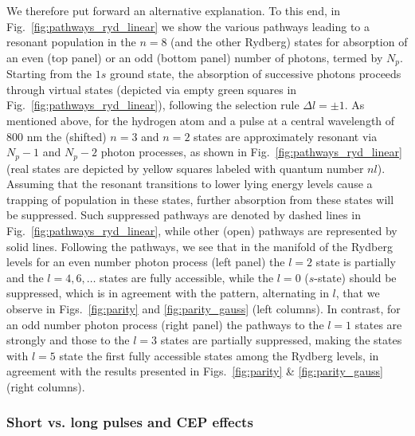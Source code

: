 We therefore put forward an alternative explanation. To this end, in Fig.\ \ref{fig:pathways_ryd_linear} we show the various pathways leading to a resonant population in the $n=8$ (and the other Rydberg) states for absorption of an even (top panel) or an odd (bottom panel) number of photons, termed by $N_p$. Starting from the $1s$ ground state, the absorption of successive photons proceeds through virtual states (depicted via empty green squares in Fig.\ \ref{fig:pathways_ryd_linear}), following the selection rule $\Delta l = \pm 1$. As mentioned above, for the hydrogen atom and a pulse at a central wavelength of 800 nm the (shifted) $n=3$ and $n=2$ states are approximately resonant via $N_p-1$ and $N_p-2$ photon processes, as shown in Fig.\ \ref{fig:pathways_ryd_linear} (real states are depicted by yellow squares labeled with quantum number $nl$). Assuming that the resonant transitions to lower lying energy levels cause a trapping of population in these states, further absorption from these states will be suppressed. Such suppressed pathways are denoted by dashed lines in Fig.\ \ref{fig:pathways_ryd_linear}, while other (open) pathways are represented by solid lines. Following the pathways, we see that in the manifold of the Rydberg levels for an even number photon process (left panel) the $l = 2$ state is partially and the $l = 4, 6, \ldots$ states are fully accessible, while the $l=0$ ($s$-state) should be suppressed, which is in agreement with the pattern, alternating in $l$, that we observe in Figs.\ \ref{fig:parity} and \ref{fig:parity_gauss} (left columns). In contrast, for an odd number photon process (right panel) the pathways to the $l=1$ states are strongly and those to the $l=3$ states are partially suppressed, making the states with $l=5$ state the first fully accessible states among the Rydberg levels, in agreement with the results presented in Figs.\ \ref{fig:parity} \& \ref{fig:parity_gauss} (right columns).

\subsubsection{Short vs. long pulses and CEP effects}
\label{ssub:pulse-length}


